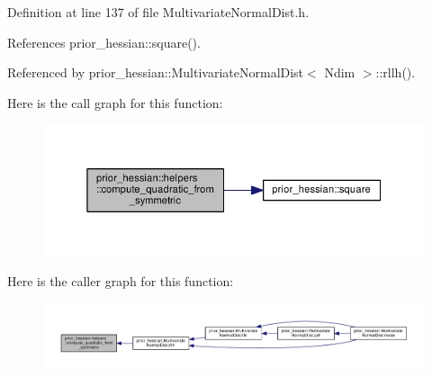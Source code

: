 Definition at line 137 of file Multivariate\+Normal\+Dist.\+h.



References prior\+\_\+hessian\+::square().



Referenced by prior\+\_\+hessian\+::\+Multivariate\+Normal\+Dist$<$ Ndim $>$\+::rllh().



Here is the call graph for this function\+:\nopagebreak
\begin{figure}[H]
\begin{center}
\leavevmode
\includegraphics[width=345pt]{namespaceprior__hessian_1_1helpers_a5d1bbe705c849e9c225a831c853be8a7_cgraph}
\end{center}
\end{figure}




Here is the caller graph for this function\+:\nopagebreak
\begin{figure}[H]
\begin{center}
\leavevmode
\includegraphics[width=350pt]{namespaceprior__hessian_1_1helpers_a5d1bbe705c849e9c225a831c853be8a7_icgraph}
\end{center}
\end{figure}


